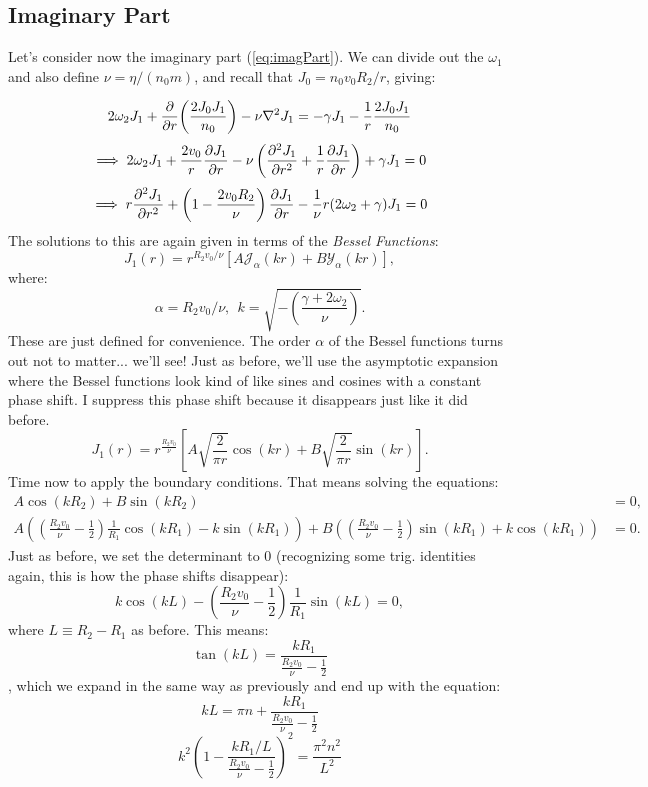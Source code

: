 \documentclass[12pt]{article}
\begin{document}
 	\subsection{Imaginary Part}
 	Let's consider now the imaginary part (\ref{eq:imagPart}).  We can divide out the $\omega_1$ and also define $\nu = \eta/(n_0 m)$, and recall that $J_0 = n_0 v_0 R_2 / r$, giving:
 	
 	\[ 2\omega_2J_1 + \pdv{r}(\frac{2J_0J_1}{n_0}) - \nu \laplacian{J_1} = -\gamma J_1 - \frac{1}{r} \frac{2J_0J_1}{n_0} \]
 	\[ \implies 2\omega_2 J_1 + \frac{2 v_0}{r}\pdv{J_1}{r}  - \nu \left( \pdv[2]{J_1}{r} + \frac{1}{r}\pdv{J_1}{r}\right) + \gamma J_1 = 0 \]
 	\begin{equation}
 	\label{eq:imagEquation}
 	\implies r\pdv[2]{J_1}{r} + \left(1 - \frac{2v_0R_2}{\nu}\right)\pdv{J_1}{r} - \frac{1}{\nu}r(2\omega_2 + \gamma)J_1=0
 	\end{equation}
 	The solutions to this are again given in terms of the \textit{Bessel Functions}:
 	\begin{equation}
 	J_1(r) = r^{R_2v_0/\nu} \left[ A \mathcal{J}_\alpha \left( kr \right) + B \mathcal{Y}_\alpha \left( kr \right) \right],
 	\end{equation}
 	where:
 	\begin{equation}
 	\alpha = R_2v_0/\nu,\ \  k = \sqrt{-\left( \frac{\gamma + 2\omega_2}{\nu} \right)}.
 	\end{equation}
 	These are just defined for convenience. The order $\alpha$ of the Bessel functions turns out not to matter... we'll see!  Just as before, we'll use the asymptotic expansion where the Bessel functions look kind of like sines and cosines with a constant phase shift.  I suppress this phase shift because it disappears just like it did before.
 	\begin{equation}
 	J_1(r) = r^{\frac{R_2v_0}{\nu}} \left[ A\sqrt{\frac{2}{\pi r}}\cos(kr) + B\sqrt{\frac{2}{\pi r}}\sin(kr) \right].
 	\end{equation}
 	Time now to apply the boundary conditions.  That means solving the equations:
 	\begin{equation}
 	\begin{aligned}
 		A\cos(kR_2) + B\sin(kR_2) &= 0, \\
 		A \left( \left( \frac{R_2v_0}{\nu} - \frac{1}{2} \right)\frac{1}{R_1}\cos(kR_1) - k \sin(kR_1) \right) + B \left( \left(\frac{R_2v_0}{\nu} - \frac{1}{2} \right)\sin(kR_1) + k \cos(kR_1) \right) &= 0.
 	\end{aligned}
 	\end{equation}
 	Just as before, we set the determinant to $0$ (recognizing some trig. identities again, this is how the phase shifts disappear):
 	\begin{equation}
 	k\cos(kL) - \left(\frac{R_2v_0}{\nu} -\frac{1}{2}\right)\frac{1}{R_1}\sin(kL) = 0,
 	\end{equation}
 	where $L \equiv R_2 - R_1$ as before.  This means:
 	\[\tan(kL) = \frac{kR_1}{\frac{R_2v_0}{\nu} - \frac{1}{2}}\],
 	which we expand in the same way as previously and end up with the equation:
 	\[kL = \pi n + \frac{kR_1}{\frac{R_2v_0}{\nu} - \frac{1}{2}}\]
 	\[k^2\left(1 - \frac{kR_1 / L}{\frac{R_2v_0}{\nu} - \frac{1}{2}} \right)^2 = \frac{\pi^2 n^2}{L^2}\]
 	
 	
\end{document}
